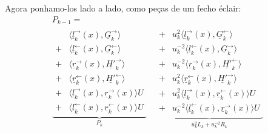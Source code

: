 \noindent Agora ponhamo-los lado a lado, como peças de um fecho éclair:
\[
\begin{gathered}
P_{k-1}=\\[-1mm]
\underbrace{\begin{aligned}
 &\langle\underline l_k^{\rightarrow}(x),
          \underline G_k^{\rightarrow}\rangle\\
 +{}&\langle\underline l_k^{\leftarrow}(x),
             \underline G_k^{\leftarrow}\rangle\\
 +{}&\langle\underline r_k^{\rightarrow}(x),
             \underline{H'}_k^{\rightarrow}\rangle\\
 +{}&\langle\underline r_k^{\leftarrow}(x),
             \underline{H'}_k^{\leftarrow}\rangle\\
 +{}&\langle\underline l_k^{\rightarrow}(x),
             \underline r_k^{\rightarrow}(x)\rangle U\\
 +{}&\langle\underline l_k^{\leftarrow}(x),
             \underline r_k^{\leftarrow}(x)\rangle U
\end{aligned}}_{P_k}
\quad
\underbrace{\begin{aligned}
 +{}&u_k^2\langle\underline l_k^{\rightarrow}(x),
                    \underline G_k^{\leftarrow}\rangle\\
 +{}&u_k^{-2}\langle\underline l_k^{\leftarrow}(x),
                       \underline G_k^{\rightarrow}\rangle\\
 +{}&u_k^{-2}\langle\underline r_k^{\rightarrow}(x),
                       \underline{H'}_k^{\leftarrow}\rangle\\
 +{}&u_k^2\langle\underline r_k^{\leftarrow}(x),
                    \underline{H'}_k^{\rightarrow}\rangle\\
 +{}&u_k^2\langle\underline l_k^{\rightarrow}(x),
                    \underline r_k^{\leftarrow}(x)\rangle U\\
 +{}&u_k^{-2}\langle\underline l_k^{\leftarrow}(x),
                       \underline r_k^{\rightarrow}(x)\rangle U
\end{aligned}}_{u_k^2L_k+u_k^{-2}R_k}
\end{gathered}
\]


